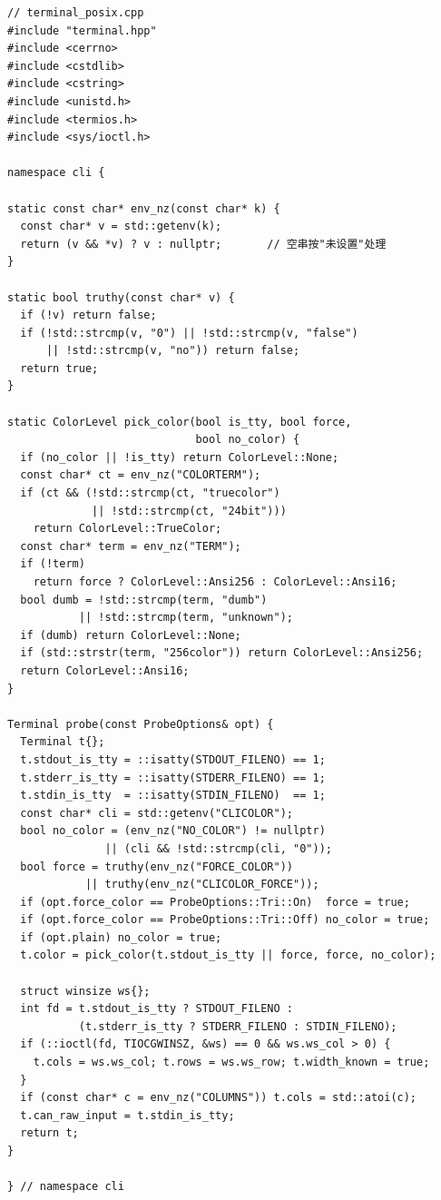 \documentclass[12pt,a4paper,fontset=fandol]{ctexbook}
\begin{document}
\begin{lstlisting}[caption={POSIX 分支的实现要点（terminal\_posix.cpp）}]
// terminal_posix.cpp
#include "terminal.hpp"
#include <cerrno>
#include <cstdlib>
#include <cstring>
#include <unistd.h>
#include <termios.h>
#include <sys/ioctl.h>

namespace cli {

static const char* env_nz(const char* k) {
  const char* v = std::getenv(k);
  return (v && *v) ? v : nullptr;       // 空串按"未设置"处理
}

static bool truthy(const char* v) {
  if (!v) return false;
  if (!std::strcmp(v, "0") || !std::strcmp(v, "false")
      || !std::strcmp(v, "no")) return false;
  return true;
}

static ColorLevel pick_color(bool is_tty, bool force,
                             bool no_color) {
  if (no_color || !is_tty) return ColorLevel::None;
  const char* ct = env_nz("COLORTERM");
  if (ct && (!std::strcmp(ct, "truecolor")
             || !std::strcmp(ct, "24bit")))
    return ColorLevel::TrueColor;
  const char* term = env_nz("TERM");
  if (!term)
    return force ? ColorLevel::Ansi256 : ColorLevel::Ansi16;
  bool dumb = !std::strcmp(term, "dumb")
           || !std::strcmp(term, "unknown");
  if (dumb) return ColorLevel::None;
  if (std::strstr(term, "256color")) return ColorLevel::Ansi256;
  return ColorLevel::Ansi16;
}

Terminal probe(const ProbeOptions& opt) {
  Terminal t{};
  t.stdout_is_tty = ::isatty(STDOUT_FILENO) == 1;
  t.stderr_is_tty = ::isatty(STDERR_FILENO) == 1;
  t.stdin_is_tty  = ::isatty(STDIN_FILENO)  == 1;
  const char* cli = std::getenv("CLICOLOR");
  bool no_color = (env_nz("NO_COLOR") != nullptr)
               || (cli && !std::strcmp(cli, "0"));
  bool force = truthy(env_nz("FORCE_COLOR"))
            || truthy(env_nz("CLICOLOR_FORCE"));
  if (opt.force_color == ProbeOptions::Tri::On)  force = true;
  if (opt.force_color == ProbeOptions::Tri::Off) no_color = true;
  if (opt.plain) no_color = true;
  t.color = pick_color(t.stdout_is_tty || force, force, no_color);

  struct winsize ws{};
  int fd = t.stdout_is_tty ? STDOUT_FILENO :
           (t.stderr_is_tty ? STDERR_FILENO : STDIN_FILENO);
  if (::ioctl(fd, TIOCGWINSZ, &ws) == 0 && ws.ws_col > 0) {
    t.cols = ws.ws_col; t.rows = ws.ws_row; t.width_known = true;
  }
  if (const char* c = env_nz("COLUMNS")) t.cols = std::atoi(c);
  t.can_raw_input = t.stdin_is_tty;
  return t;
}

} // namespace cli
\end{lstlisting}
\end{document}
